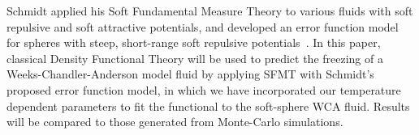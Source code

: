 \documentclass[double,12pt]{beavtex}
\begin{document}

Schmidt applied his Soft Fundamental Measure Theory to various fluids 
with soft repulsive and soft attractive potentials, and developed an error function  
model 
for spheres with steep, short-range soft repulsive 
potentials~\cite{schmidt2000fluid}.
In this paper, classical Density Functional 
Theory will be used to predict the freezing of a Weeks-Chandler-Anderson 
model fluid by applying SFMT with Schmidt's proposed error function model, 
in which we have incorporated our temperature dependent parameters to fit the 
functional to the soft-sphere WCA fluid.
Results will be compared to those generated from Monte-Carlo simulations.





\end{document}

